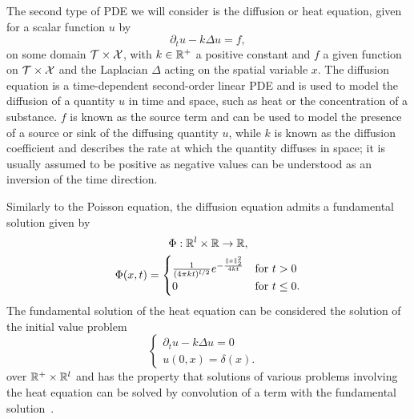 The second type of PDE we will consider is the diffusion or heat equation, given for a scalar function $u$ by
\begin{equation}\label{eq:diffusion}
    \partial_t u - k \Delta u = f,
\end{equation}
on some domain $\mathcal T \times \mathcal X$, with $k\in \mathbb{R}^+$ a positive constant and $f$ a given function on $\mathcal T \times \mathcal X$ and the Laplacian $\Delta$ acting on the spatial variable $x$.
The diffusion equation is a time-dependent second-order linear PDE and is used to model the diffusion of a quantity $u$ in time and space, such as heat or the concentration of a substance.
$f$ is known as the source term and can be used to model the presence of a source or sink of the diffusing quantity $u$, while $k$ is known as the diffusion coefficient and describes the rate at which the quantity diffuses in space; it is usually assumed to be positive as negative values can be understood as an inversion of the time direction.

Similarly to the Poisson equation, the diffusion equation admits a fundamental solution given by
\[
    \begin{gathered}
        \Phi : \mathbb{R}^l \times \mathbb{R} \rightarrow \mathbb{R}, \\
        \Phi(x,t) = 
        \begin{cases}
            \frac{1}{(4\pi k t)^{l/2}} e^{-\frac{\|x\|_2^2}{4kt}} & \text{for } t > 0 \\
            0 & \text{for } t \leq 0.
        \end{cases}
    \end{gathered}
\]
The fundamental solution of the heat equation can be considered the solution of the initial value problem 
\[
    \begin{cases}
        \partial_t u - k \Delta u = 0 & \\
        u(0,x) = \delta(x). &
    \end{cases}
\]
over $\mathbb{R}^+ \times \mathbb{R}^l$ and has the property that solutions of various problems involving the heat equation can be solved by convolution of a term with the fundamental solution~\cite[Chapter 2.3, Theorem 1-2]{Evans2010}.\medskip

